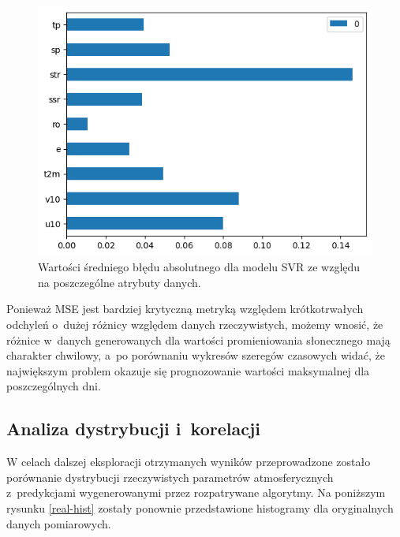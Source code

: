 \begin{figure}[H]
    \centering
    \includegraphics[width=\textwidth]{images/svr_mae_bar.png}
    \caption{Wartości średniego błędu absolutnego dla modelu SVR ze względu na poszczególne atrybuty danych.}
    \label{svr-mae-bar}
\end{figure}

Ponieważ MSE jest bardziej krytyczną metryką względem krótkotrwałych odchyleń o~dużej różnicy względem
danych rzeczywistych, możemy wnosić, że różnice w~danych generowanych dla wartości promieniowania słonecznego
mają charakter chwilowy, a~po porównaniu wykresów szeregów czasowych widać, że największym problem okazuje
się prognozowanie wartości maksymalnej dla poszczególnych dni.

\pagebreak

\subsection{Analiza dystrybucji i~korelacji}

W celach dalszej eksploracji otrzymanych wyników przeprowadzone zostało porównanie dystrybucji 
rzeczywistych parametrów atmosferycznych z~predykcjami wygenerowanymi przez rozpatrywane algorytmy.
Na poniższym rysunku \ref{real-hist} zostały ponownie przedstawione histogramy dla oryginalnych danych pomiarowych.

